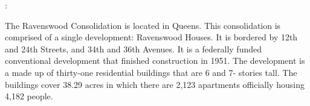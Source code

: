 :       

     

The Ravenswood Consolidation is located in Queens. This consolidation is comprised of a single development: Ravenswood Houses. It is bordered by 12th and 24th Streets, and 34th and 36th Avenues. It is a federally funded conventional development that finished construction in 1951. The development is a made up of thirty-one residential buildings that are 6 and 7- stories tall. The buildings cover 38.29 acres in which there are 2,123 apartments officially housing 4,182 people.   

 